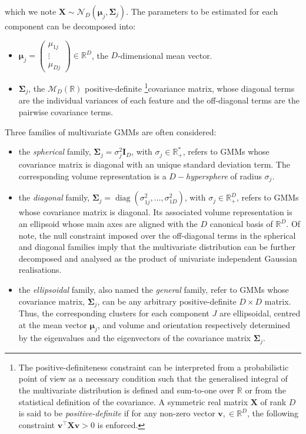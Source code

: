 which we note
\(\boldsymbol{X} \sim \mathcal{N}_D(\boldsymbol{\mu}_j, \boldsymbol{\Sigma}_j)\). The parameters to be estimated for each component can be decomposed into:

\begin{itemize}
\item
  \(\boldsymbol{\mu}_j=\begin{pmatrix} \mu_{1j} \\ \vdots \\ \mu_{Dj} \end{pmatrix} \in \mathbb{R}^D\), the \(D\)-dimensional mean vector.
\item
  \(\boldsymbol{\Sigma}_j\), the \(\mathcal{M}_D(\mathbb{R})\) positive-definite \footnote{The positive-definiteness constraint can be interpreted from a probabilistic point of view as a necessary condition such that the generalised integral of the multivariate distribution is defined and sum-to-one over \(\mathbb{R}\) or from the statistical definition of the covariance. A symmetric real matrix \(\boldsymbol{X}\) of rank \(D\) is said to be \emph{positive-definite} if for any non-zero vector
    \(\mathbf{v}, \in \mathbb{R}^D\), the following constraint
    \(\mathbf{v}^\top \boldsymbol{X} \mathbf{v} > 0\) is enforced.}covariance matrix, whose diagonal terms are the individual variances of each feature and the off-diagonal terms are the pairwise covariance terms.
\end{itemize}

Three families of multivariate GMMs are often considered:

\begin{itemize}
\tightlist
\item
  the \emph{spherical} family, \(\boldsymbol{\Sigma}_j=\sigma_j^2 \boldsymbol{I}_D\), with \(\sigma_j \in \mathbb{R}_{+}^*\), refers to GMMs whose covariance matrix is diagonal with an unique standard deviation term. The corresponding volume representation is a \(D-\)\emph{hypersphere} of radius \(\sigma_j\).
\item
  the \emph{diagonal} family, \(\boldsymbol{\Sigma}_j=\operatorname{diag} \left(\sigma_{1j}^2, \ldots, \sigma_{1D}^2\right)\), with \(\sigma_j \in \mathbb{R}_{+}^D\), refers to GMMs whose covariance matrix is diagonal. Its associated volume representation is an ellipsoid whose main axes are aligned with the \(D\) canonical basis of \(\mathbb{R}^D\). Of note, the null constraint imposed over the off-diagonal terms in the spherical and diagonal families imply that the multivariate distribution can be further decomposed and analysed as the product of univariate independent Gaussian realisations.
\item
  the \emph{ellipsoidal} family, also named the \emph{general} family, refer to GMMs whose covariance matrix, \(\boldsymbol{\Sigma}_j\), can be any arbitrary positive-definite \(D \times D\) matrix. Thus, the corresponding clusters for each component \(J\) are ellipsoidal, centred at the mean vector \(\boldsymbol{\mu}_j\), and volume and orientation respectively determined by the eigenvalues and the eigenvectors of the covariance matrix \(\boldsymbol{\Sigma}_j\).
\end{itemize}

